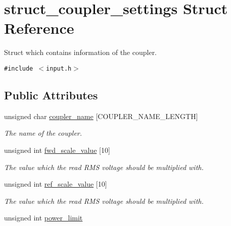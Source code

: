 \hypertarget{structstruct__coupler__settings}{
\section{struct\_\-coupler\_\-settings Struct Reference}
\label{structstruct__coupler__settings}
}
Struct which contains information of the coupler.  


{\tt \#include $<$input.h$>$}

\subsection*{Public Attributes}
\begin{CompactItemize}
\item 
\hypertarget{structstruct__coupler__settings_4f161be30ca498b27863fc1c40c77c6a}{
unsigned char \hyperlink{structstruct__coupler__settings_4f161be30ca498b27863fc1c40c77c6a}{coupler\_\-name} \mbox{[}COUPLER\_\-NAME\_\-LENGTH\mbox{]}}
\label{structstruct__coupler__settings_4f161be30ca498b27863fc1c40c77c6a}

\begin{CompactList}\small\item\em The name of the coupler. \item\end{CompactList}\item 
\hypertarget{structstruct__coupler__settings_d30b9d4217256e3cb82dfd5f4bf437b8}{
unsigned int \hyperlink{structstruct__coupler__settings_d30b9d4217256e3cb82dfd5f4bf437b8}{fwd\_\-scale\_\-value} \mbox{[}10\mbox{]}}
\label{structstruct__coupler__settings_d30b9d4217256e3cb82dfd5f4bf437b8}

\begin{CompactList}\small\item\em The value which the read RMS voltage should be multiplied with. \item\end{CompactList}\item 
\hypertarget{structstruct__coupler__settings_5dbec83b13eab6ed871b0c59b4694144}{
unsigned int \hyperlink{structstruct__coupler__settings_5dbec83b13eab6ed871b0c59b4694144}{ref\_\-scale\_\-value} \mbox{[}10\mbox{]}}
\label{structstruct__coupler__settings_5dbec83b13eab6ed871b0c59b4694144}

\begin{CompactList}\small\item\em The value which the read RMS voltage should be multiplied with. \item\end{CompactList}\item 
\hypertarget{structstruct__coupler__settings_981bbf5498298a2cf3467bee22910686}{
unsigned int \hyperlink{structstruct__coupler__settings_981bbf5498298a2cf3467bee22910686}{power\_\-limit}}
\label{structstruct__coupler__settings_981bbf5498298a2cf3467bee22910686}


\end{CompactItemize}
